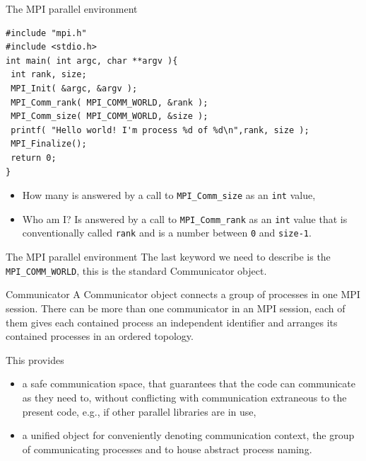 \documentclass[xcolor={svgnames,usenames}]{beamer}
\begin{document}
\begin{frame}[fragile]{The MPI parallel environment}
\begin{verbatim}
#include "mpi.h"
#include <stdio.h>
int main( int argc, char **argv ){
 int rank, size;
 MPI_Init( &argc, &argv );
 MPI_Comm_rank( MPI_COMM_WORLD, &rank );
 MPI_Comm_size( MPI_COMM_WORLD, &size );
 printf( "Hello world! I'm process %d of %d\n",rank, size );
 MPI_Finalize();
 return 0;
}
\end{verbatim}
\begin{itemize}
	\item How many is answered by a call to \texttt{MPI_Comm_size} as an \texttt{int} value,
	\item Who am I? Is answered by a call to \texttt{MPI_Comm_rank} as an \texttt{int} value that is conventionally called \texttt{rank} and is a number between \texttt{0} and \texttt{size-1}.
\end{itemize}
\end{frame}


\begin{frame}{The MPI parallel environment}
	The last keyword we need to describe is the \texttt{MPI_COMM_WORLD}, this is the standard Communicator object.

	\begin{block}{Communicator}
	A Communicator object connects a group of processes in one MPI session. There can be more than one communicator in an MPI session, each of them gives each contained process an independent identifier and arranges its contained processes in an ordered topology.
	\end{block}

	This provides
	\begin{itemize}
	\item a safe communication space, that guarantees that the code can communicate as they
	need to, without conflicting with communication extraneous to the present code, e.g., if other parallel libraries are in use,
	\item a unified object for conveniently denoting communication context, the group of communicating processes and to house abstract process naming.
	\end{itemize}
\end{frame}
\end{document}
